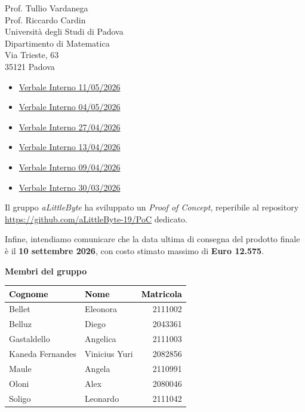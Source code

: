 \documentclass[a4paper,11pt]{letter}
\begin{document}
\begin{letter}{Prof. Tullio Vardanega\\Prof. Riccardo Cardin\\Università degli Studi di Padova\\Dipartimento di Matematica\\Via Trieste, 63\\35121 Padova}
\begin{multicols}{2}
\begin{itemize}[noitemsep, topsep=0pt]
    \item \href{https://alittlebyte-19.github.io/Documentazione/RTB/Verbali/Verbali%20Interni/Verbale_Interno_2026_05_11.pdf}{Verbale Interno 11/05/2026}
    \item \href{https://alittlebyte-19.github.io/Documentazione/RTB/Verbali/Verbali%20Interni/Verbale_Interno_2026_05_04.pdf}{Verbale Interno 04/05/2026}
    \item \href{https://alittlebyte-19.github.io/Documentazione/RTB/Verbali/Verbali%20Interni/Verbale_Interno_2026_04_27.pdf}{Verbale Interno 27/04/2026}
    \item \href{https://alittlebyte-19.github.io/Documentazione/RTB/Verbali/Verbali%20Interni/Verbale_Interno_2026_04_13.pdf}{Verbale Interno 13/04/2026}
    \item \href{https://alittlebyte-19.github.io/Documentazione/RTB/Verbali/Verbali%20Interni/Verbale_Interno_2026_04_09.pdf}{Verbale Interno 09/04/2026}
    \item \href{https://alittlebyte-19.github.io/Documentazione/RTB/Verbali/Verbali%20Interni/Verbale_Interno_2026_03_30.pdf}{Verbale Interno 30/03/2026}
  \end{itemize}
  \end{multicols}

  \vspace{0.3em}

  Il gruppo \textit{aLittleByte} ha sviluppato un \textit{Proof of Concept}, reperibile al
  repository \url{https://github.com/aLittleByte-19/PoC} dedicato.

    Infine, intendiamo comunicare che la data ultima di consegna del prodotto finale è il \textbf{10 settembre 2026}, con
    costo stimato massimo di \textbf{Euro 12.575}.

    \newpage

    \textbf{Membri del gruppo}
  \begin{center}
  \setlength{\arrayrulewidth}{0.8pt}
  \begin{tabular}{|l|l|r|}
  \hline
  \rowcolor{primarycolor!20}
  \textcolor{black}{\textbf{Cognome}} & \textcolor{black}{\textbf{Nome}} & \textcolor{black}{\textbf{Matricola}} \\
  \hline
  Bellet & Eleonora & 2111002\\
  \hline
  Belluz & Diego & 2043361\\
  \hline
  Gastaldello & Angelica & 2111003\\
  \hline
  Kaneda Fernandes & Vinicius Yuri & 2082856 \\
  \hline
  Maule & Angela & 2110991\\
  \hline
  Oloni & Alex & 2080046\\
  \hline
  Soligo & Leonardo & 2111042\\
  \hline
  \end{tabular}
  \end{center}


\end{letter}
\end{document}
